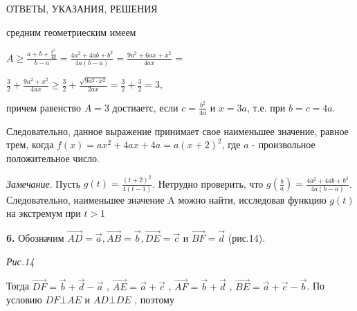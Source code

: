\begin{flushleft}
\setlength{\parindent}{0pt}
\begin{center}
  ОТВЕТЫ, УКАЗАНИЯ, РЕШЕНИЯ  
\end{center}

\begin{multicols}{2}
средним геометриеским имеем 

\(A\ge\frac{a+b+\frac{b^2}{4a}}{b-a} = \frac{4a^2+4ab+b^2}{4a(b-a)} = \frac{9a^2+6ax+x^2}{4ax}\) =

\(\frac{3}{2}+\frac{9a^2+x^2}{4ax} \ge \frac{3}{2} + \frac{\sqrt{9a^2\cdot x^2}}{2ax} = \frac{3}{2} + \frac{3}{2} = 3\), 

причем равенство \(A = 3\) достиаетс, если \(c = \frac{b^2}{4a}\) и \(x = 3a\), т.е. при \(b = c = 4a\).

Следовательно, данное выражение принимает свое наименьшее значение, равное трем, когда \(f(x) = ax^2 + 4ax + 4a = a(x + 2)^2\), где \(a\) - произвольное положительное число.

\textit{Замечание}. 
Пусть \(g(t) = \frac{(t+2)^2}{4(t-1)}\). Нетрудно проверить, что \(g(\frac{b}{a}) = \frac{4a^2+4ab+b^2}{4a(b-a)}\). Следовательно, наименьшее значение A можно найти, исследовав функцию \(g(t)\) на экстремум при \(t>1\)

\textbf{6.}
Обозначим \(\Vec{AD} = \Vec{a}, \Vec{AB} = \Vec{b}, \Vec{DE} = \Vec{c}\) и \(\Vec{BF} = \Vec{d}\) (рис.14).


\textit{Рис.14}

Тогда \(\Vec{DF} = \Vec{b} + \Vec{d} - \Vec{a}\) , \(\Vec{AE} = \Vec{a} + \Vec{c}\) , \(\Vec{AF} = \Vec{b} + \Vec{d}\) , \(\Vec{BE} = \Vec{a} + \Vec{c} - \Vec{b}\). По условию \(DF \bot AE\) и \(AD \bot DE\) , поэтому 


\end{multicols}
\end{flushleft}
